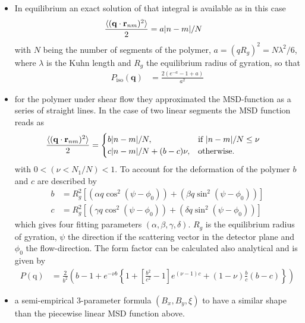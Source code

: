 \begin{itemize}
\item In equilibrium an exact solution of that integral is available as in this case
\begin{align}
  \frac{\langle(\mathbf{q}\cdot\mathbf{r}_{nm})^2\rangle}{2} & = a \abs{n-m}/N
\end{align}
with $N$ being the number of segments of the polymer, $a=(qR_g)^2=N\lambda^2/6$, where $\lambda$ is the Kuhn length and $R_g$  the equilibrium radius of gyration, so that
\begin{align}
  P_\mathrm{iso}(\mathbf{q}) & = \frac{2\left(e^{-a}-1+a\right)}{a^2}
\end{align}
\item for the polymer under shear flow they approximated the MSD-function as a series of straight lines. In the case of two linear segments the MSD function reads as
    \begin{align}
      \frac{\langle(\mathbf{q}\cdot\mathbf{r}_{nm})^2\rangle}{2} &=
      \begin{cases}
        b\abs{n-m}/N, & \mbox{if } \abs{n-m}/N \leq \nu \\
        c\abs{n-m}/N+(b-c)\nu, & \mbox{otherwise}.
      \end{cases}
    \end{align}
    with $0<(\nu<N_1/N)<1$. To account for the deformation of the polymer $b$ and $c$ are described by
    \begin{align}
      b &= R_g^2\left[(\alpha q \cos^2(\psi-\phi_0))+(\beta q \sin^2(\psi-\phi_0))\right] \\
      c &= R_g^2\left[(\gamma q \cos^2(\psi-\phi_0))+(\delta q \sin^2(\psi-\phi_0))\right]
    \end{align}
    which gives four fitting parameters $(\alpha,\beta,\gamma,\delta)$. $R_g$ is the equilibrium radius of gyration, $\psi$ the direction if the scattering vector in the detector plane and $\phi_0$ the flow-direction. The form factor can be calculated also analytical and is given by
    \begin{align}
      P(\mathrm{q}) & = \frac{2}{b^2}\left(b-1+e^{-\nu b} \left\{1+\left[\frac{b^2}{c^2}-1\right]e^{(\nu-1)c}+
                        (1-\nu)\frac{b}{c}(b-c)\right\}\right)
    \end{align}
\item  a semi-empirical 3-parameter formula $(B_x,B_y,\xi)$ to have a similar shape than the piecewise linear MSD function above.
    \begin{multline}

\end{multline}
\end{itemize}
